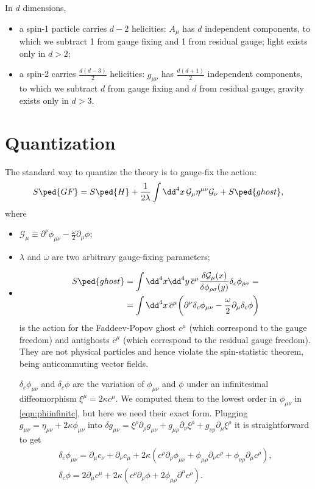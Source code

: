 \documentclass[a4paper,12pt]{book}
\begin{document}
In $d$ dimensions,
\begin{itemize}
\item a spin-1 particle carries $d-2$ helicities: $A_\mu$ has $d$ independent components, to which we subtract 1 from gauge fixing and 1 from residual gauge; light exists only in $d>2$;
\item a spin-2 carries $\frac{d(d-3)}2$ helicities: $g_{\mu\nu}$ has $\frac{d(d+1)}2$ independent components, to which we subtract $d$ from gauge fixing and $d$ from residual gauge; gravity exists only in $d>3$.
\end{itemize}

\section{Quantization}
The standard way to quantize the theory is to gauge-fix the action:
\[S\ped{GF}=S\ped{H}+\frac1{2\lambda}\int\dd^4x\,\mathcal G_\mu\eta^{\mu\nu}\mathcal G_\nu+S\ped{ghost},\]
where
\begin{itemize}
\item $\mathcal G_\mu\equiv\partial^\nu\phi_{\mu\nu}-\frac\omega2\partial_\mu\phi$;
\item $\lambda$ and $\omega$ are two arbitrary gauge-fixing parameters;
\item \begin{align*}
S\ped{ghost}&=\int\dd^4x\dd^4y\,\overline c^\mu\frac{\delta\mathcal G_\mu(x)}{\delta\phi_{\rho\sigma}(y)}\delta_c\phi_{\rho\sigma}=\\
&=\int\dd^4x\,\overline c^\mu\biggl(\partial^\nu\delta_c\phi_{\mu\nu}-\frac\omega2\partial_\mu\delta_c\phi\biggr)%
\end{align*}is the action for the Faddeev-Popov ghost $c^\mu$ (which correspond to the gauge freedom) and antighosts $\overline c^\mu$ (which correspond to the residual gauge freedom). They are not physical particles and hence violate the spin-statistic theorem, being anticommuting vector fields.

$\delta_c\phi_{\mu\nu}$ and $\delta_c\phi$ are the variation of $\phi_{\mu\nu}$ and $\phi$ under an infinitesimal diffeomorphism $\xi^\mu=2\kappa c^\mu$. We computed them to the lowest order in $\phi_{\mu\nu}$ in \cref{eqn:phiinfinitc}, but here we need their exact form. Plugging $g_{\mu\nu}=\eta_{\mu\nu}+2\kappa\phi_{\mu\nu}$ into $\delta g_{\mu\nu}=\xi^\rho\partial_\rho g_{\mu\nu}+g_{\mu\rho}\partial_\nu\xi^\rho+g_{\nu\rho}\partial_\mu\xi^\rho$ it is straightforward to get
\begin{gather*}
\delta_c\phi_{\mu\nu}=\partial_\mu c_\nu+\partial_\nu c_\mu+2\kappa(c^\rho\partial_\rho\phi_{\mu\nu}+\phi_{\mu\rho}\partial_\nu c^\rho+\phi_{\nu\rho}\partial_\mu c^\rho),\\
\delta_c\phi=2\partial_\mu c^\mu+2\kappa(c^\rho\partial_\rho \phi+2\phi_{\mu\rho}\partial^\mu c^\rho).
\end{gather*}
\end{itemize}
\end{document}
